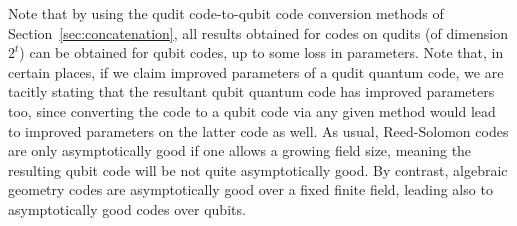 \documentclass[11pt]{article}
\theoremstyle{definition}
\begin{document}
Note that by using the qudit code-to-qubit code conversion methods of Section~\ref{sec:concatenation}, all results obtained for codes on qudits (of dimension $2^t$) can be obtained for qubit codes, up to some loss in parameters. Note that, in certain places, if we claim improved parameters of a qudit quantum code, we are tacitly stating that the resultant qubit quantum code has improved parameters too, since converting the code to a qubit code via any given method would lead to improved parameters on the latter code as well. As usual, Reed-Solomon codes are only asymptotically good if one allows a growing field size, meaning the resulting qubit code will be not quite asymptotically good. By contrast, algebraic geometry codes are asymptotically good over a fixed finite field, leading also to asymptotically good codes over qubits.
\end{document}
